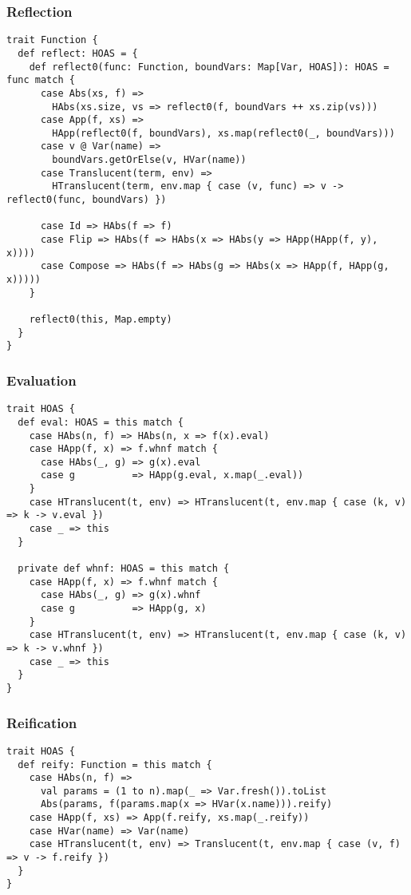 \documentclass[../../main.tex]{subfiles}
\begin{document}
\subsubsection{Reflection}

\begin{verbatim}
trait Function {
  def reflect: HOAS = {
    def reflect0(func: Function, boundVars: Map[Var, HOAS]): HOAS = func match {
      case Abs(xs, f) =>
        HAbs(xs.size, vs => reflect0(f, boundVars ++ xs.zip(vs)))
      case App(f, xs) =>
        HApp(reflect0(f, boundVars), xs.map(reflect0(_, boundVars)))
      case v @ Var(name) =>
        boundVars.getOrElse(v, HVar(name))
      case Translucent(term, env) =>
        HTranslucent(term, env.map { case (v, func) => v -> reflect0(func, boundVars) })

      case Id => HAbs(f => f)
      case Flip => HAbs(f => HAbs(x => HAbs(y => HApp(HApp(f, y), x))))
      case Compose => HAbs(f => HAbs(g => HAbs(x => HApp(f, HApp(g, x)))))
    }

    reflect0(this, Map.empty)
  }
}
\end{verbatim}

\subsubsection{Evaluation}
\begin{verbatim}
trait HOAS {
  def eval: HOAS = this match {
    case HAbs(n, f) => HAbs(n, x => f(x).eval)
    case HApp(f, x) => f.whnf match {
      case HAbs(_, g) => g(x).eval
      case g          => HApp(g.eval, x.map(_.eval))
    }
    case HTranslucent(t, env) => HTranslucent(t, env.map { case (k, v) => k -> v.eval })
    case _ => this
  }

  private def whnf: HOAS = this match {
    case HApp(f, x) => f.whnf match {
      case HAbs(_, g) => g(x).whnf
      case g          => HApp(g, x)
    }
    case HTranslucent(t, env) => HTranslucent(t, env.map { case (k, v) => k -> v.whnf })
    case _ => this
  }
}
\end{verbatim}

\subsubsection{Reification}
\begin{verbatim}
trait HOAS {  
  def reify: Function = this match {
    case HAbs(n, f) =>
      val params = (1 to n).map(_ => Var.fresh()).toList
      Abs(params, f(params.map(x => HVar(x.name))).reify)
    case HApp(f, xs) => App(f.reify, xs.map(_.reify))
    case HVar(name) => Var(name)
    case HTranslucent(t, env) => Translucent(t, env.map { case (v, f) => v -> f.reify })
  }
}
\end{verbatim}
\end{document}
